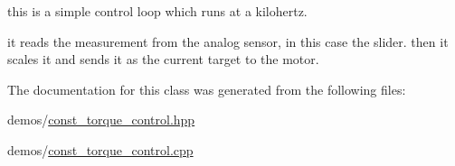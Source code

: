 this is a simple control loop which runs at a kilohertz. 

it reads the measurement from the analog sensor, in this case the slider. then it scales it and sends it as the current target to the motor. 

The documentation for this class was generated from the following files\+:\begin{DoxyCompactItemize}
\item 
demos/\hyperlink{const__torque__control_8hpp}{const\+\_\+torque\+\_\+control.\+hpp}\item 
demos/\hyperlink{const__torque__control_8cpp}{const\+\_\+torque\+\_\+control.\+cpp}\end{DoxyCompactItemize}
